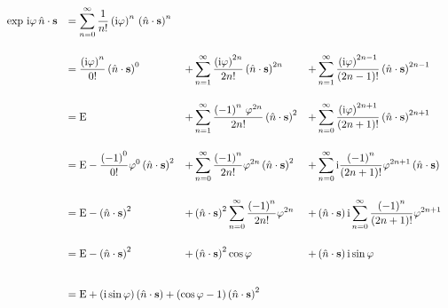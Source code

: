 \documentclass[10pt,a4paper]{article}
\newcommand{\const}[1]{\text{#1}}
\renewcommand{\i}{\const{i}}
\begin{document}
\begin{equation*}
\begin{array}{rlll}
    \exp \, \i \varphi \,
    \hat{n} \cdot \mathbf{s}
    &\displaystyle =
    \sum_{n=0}^\infty
    \frac{1}{n!}
    \left(\i \varphi\right)^n \,
    \left(\hat{n} \cdot \mathbf{s}\right)^n
    \\[25pt]
    &\displaystyle =
    \frac{\left(\i\varphi\right)^n}{0!}
    \left(\hat{n} \cdot \mathbf{s}\right)^0
    &\displaystyle +
    \sum_{n=1}^\infty
    \frac{\left(\i\varphi\right)^{2n}}{2n!}
    \left(\hat{n} \cdot \mathbf{s}\right)^{2n}
    &\displaystyle +
    \sum_{n=1}^\infty
    \frac{\left(\i\varphi\right)^{2n-1}}{(2n-1)!}
    \left(\hat{n} \cdot \mathbf{s}\right)^{2n-1}
    \\[25pt]
    &\displaystyle =
    \const{E}
    &\displaystyle +
    \sum_{n=1}^\infty
    \frac{\left(-1\right)^n \, \varphi^{2n}}{2n!}
    \left(\hat{n} \cdot \mathbf{s}\right)^2
    &\displaystyle +
    \sum_{n=0}^\infty
    \frac{\left(\i\varphi\right)^{2n+1}}{(2n+1)!}
    \left(\hat{n} \cdot \mathbf{s}\right)^{2n+1}
    \\[25pt]
    &\displaystyle =
    \const{E}
    -
    \frac{\left(-1\right)^0}{0!}
    \varphi^{0}
    \left(\hat{n} \cdot \mathbf{s}\right)^2
    &\displaystyle +
    \sum_{n=0}^\infty
    \frac{\left(-1\right)^n}{2n!}
    \varphi^{2n}
    \left(\hat{n} \cdot \mathbf{s}\right)^2
    &\displaystyle +
    \sum_{n=0}^\infty
    \i
    \frac{\left(-1\right)^n}{(2n+1)!}
    \varphi^{2n+1}
    \left(\hat{n} \cdot \mathbf{s}\right)
    \\[25pt]
    &\displaystyle =
    \const{E}
    -
    \left(\hat{n} \cdot \mathbf{s}\right)^2
    &\displaystyle +
    \left(\hat{n} \cdot \mathbf{s}\right)^2
    \sum_{n=0}^\infty
    \frac{\left(-1\right)^n}{2n!}
    \varphi^{2n}
    &\displaystyle +
    \left(\hat{n} \cdot \mathbf{s}\right)
    \i
    \sum_{n=0}^\infty
    \frac{\left(-1\right)^n}{(2n+1)!}
    \varphi^{2n+1}
    \\[25pt]
    &\displaystyle =
    \const{E}
    -
    \left(\hat{n} \cdot \mathbf{s}\right)^2
    &\displaystyle +
    \left(\hat{n} \cdot \mathbf{s}\right)^2
    \cos \varphi
    &\displaystyle +
    \left(\hat{n} \cdot \mathbf{s}\right)
    \i
    \sin \varphi
    \\[25pt]
    &\multicolumn{3}{l}{
        = \const{E} +
        \left(\i \sin \varphi\right)
        \left(\hat{n} \cdot \mathbf{s}\right) +
        \left(\cos \varphi - 1\right)
        \left(\hat{n} \cdot \mathbf{s}\right)^2
    }
\end{array}
\end{equation*}
\end{document}

